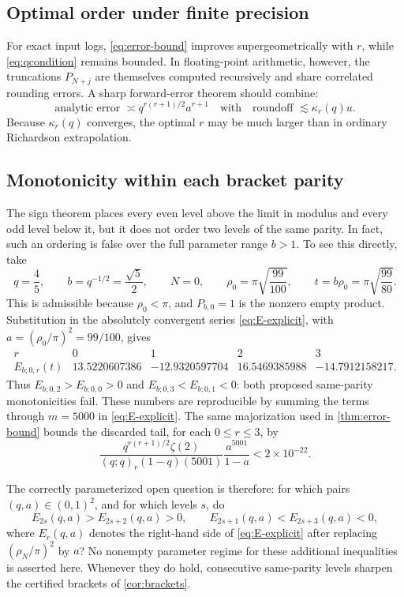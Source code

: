 \documentclass[11pt]{article}
\theoremstyle{definition}
\theoremstyle{remark}
\begin{document}
\subsection{Optimal order under finite precision}

For exact input logs, \cref{eq:error-bound} improves supergeometrically with $r$, while \cref{eq:qcondition} remains bounded. In floating-point arithmetic, however, the truncations $P_{N+j}$ are themselves computed recursively and share correlated rounding errors. A sharp forward-error theorem should combine:
\[
\text{analytic error }\asymp q^{r(r+1)/2}a^{r+1}
\quad\text{with}\quad
\text{roundoff }\lesssim\kappa_r(q)u.
\]
Because $\kappa_r(q)$ converges, the optimal $r$ may be much larger than in ordinary Richardson extrapolation.

\subsection{Monotonicity within each bracket parity}

The sign theorem places every even level above the limit in modulus and every odd level
below it, but it does not order two levels of the same parity.  In fact, such an ordering is
false over the full parameter range $b>1$.  To see this directly, take
\[
 q=\frac45,\qquad b=q^{-1/2}=\frac{\sqrt5}{2},\qquad N=0,
 \qquad \rho_0=\pi\sqrt{\frac{99}{100}},
 \qquad t=b\rho_0=\pi\sqrt{\frac{99}{80}}.
\]
This is admissible because $\rho_0<\pi$, and $P_{b,0}=1$ is the nonzero empty product.
Substitution in the absolutely convergent series \eqref{eq:E-explicit}, with
$a=(\rho_0/\pi)^2=99/100$, gives
\[
\begin{array}{c|rrrr}
r&0&1&2&3\\ \hline
E_{b;0,r}(t)
& 13.5220607386&-12.9320597704&16.5469385988&-14.7912158217.
\end{array}
\]
Thus $E_{b;0,2}>E_{b;0,0}>0$ and
$E_{b;0,3}<E_{b;0,1}<0$: both proposed same-parity monotonicities fail.
These numbers are reproducible by summing the terms through $m=5000$ in
\eqref{eq:E-explicit}.  The same majorization used in \cref{thm:error-bound} bounds the
discarded tail, for each $0\le r\le3$, by
\[
 \frac{q^{r(r+1)/2}\zeta(2)}
 {(q;q)_r(1-q)(5001)}\frac{a^{5001}}{1-a}<2\times10^{-22}.
\]

The correctly parameterized open question is therefore: for which pairs
$(q,a)\in(0,1)^2$, and for which levels $s$, do
\[
 E_{2s}(q,a)>E_{2s+2}(q,a)>0,
 \qquad
 E_{2s+1}(q,a)<E_{2s+3}(q,a)<0,
\]
where $E_r(q,a)$ denotes the right-hand side of \eqref{eq:E-explicit} after replacing
$(\rho_N/\pi)^2$ by $a$?  No nonempty parameter regime for these additional inequalities
is asserted here.  Whenever they do hold, consecutive same-parity levels sharpen the
certified brackets of \cref{cor:brackets}.
\end{document}
